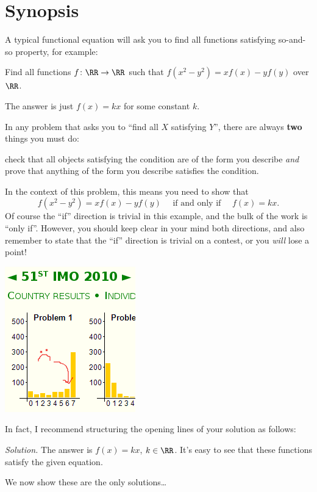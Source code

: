 \documentclass[11pt]{scrartcl}
\begin{document}
\section{Synopsis}
A typical functional equation will ask you to find all functions satisfying so-and-so property, for example:
\begin{example}[USAMO 2002]
  Find all functions $f \colon \RR \to \RR$ such that $f(x^2-y^2) = xf(x) - yf(y)$ over $\RR$.
\end{example}
The answer is just $f(x) = kx$ for some constant $k$.

In any problem that asks you to ``find all $X$ satisfying $Y$'',
there are always \textbf{two} things you must do:
\begin{itemize}
  \ii check that all objects
  satisfying the condition are of the form you describe
  \ii \emph{and} prove that anything of the form
  you describe satisfies the condition.
\end{itemize}
In the context of this problem, this means you need to show that
\[ f(x^2-y^2) = xf(x) - yf(y) \quad\text{ if and only if }\quad f(x) = kx. \]
Of course the ``if'' direction is trivial in this example,
and the bulk of the work is ``only if''.
However, you should keep clear in your mind both directions,
and also remember to state that the ``if'' direction is trivial on a contest,
or you \emph{will} lose a point!
\begin{center}
  \includegraphics[scale=0.75]{6s-at-imo-edited.png}
\end{center}
In fact, I recommend structuring the opening lines of your solution as follows:
\begin{mdframed}
  \emph{Solution.} The answer is $f(x) = kx$, $k \in \RR$.
  It's easy to see that these functions satisfy
  the given equation.

  We now show these are the only solutions\dots
\end{mdframed}
\end{document}

